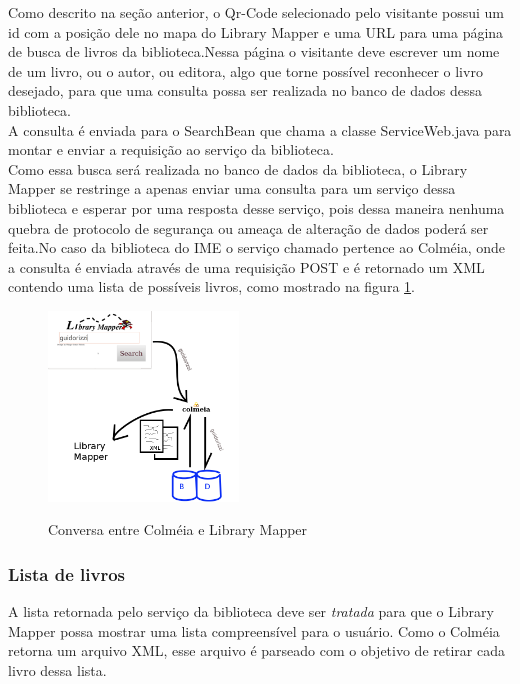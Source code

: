 \documentclass[a4paper,10pt]{article}
\begin{document}
	Como descrito na seção anterior, o Qr-Code selecionado pelo visitante possui um id com a posição dele no mapa do Library Mapper 
	e uma
	URL para uma página de busca de livros da biblioteca.Nessa página o visitante deve escrever um nome de um livro, ou o autor, 
	ou editora,
	 algo que torne possível reconhecer o livro desejado, para que uma consulta possa ser realizada no banco de dados dessa biblioteca.\\
	
	A consulta é enviada para o SearchBean que chama a classe ServiceWeb.java para montar e enviar a requisição ao serviço da biblioteca.\\

	Como essa busca será realizada no banco de dados da biblioteca, o Library Mapper se restringe a apenas enviar uma consulta para um serviço 
	 dessa biblioteca e esperar por uma resposta desse serviço, pois dessa maneira nenhuma quebra de protocolo de segurança ou ameaça de
	 alteração de 
	dados poderá ser feita.No caso da biblioteca do IME o serviço chamado pertence ao Colméia, onde a consulta é enviada através 
	de uma requisição
	POST e é retornado um XML contendo uma lista de possíveis livros, como mostrado na figura \ref{colmeia}.

		\begin{figure}[H]
	\centering
	\includegraphics[width=0.45\textwidth]{./imgs/colmeia.png}\\[0.5cm]    
	\caption{Conversa entre Colméia e Library Mapper}
	\label{colmeia}
\end{figure}
	\subsubsection{Lista de livros }
		A lista retornada pelo serviço da biblioteca deve ser {\it tratada}  para que o Library Mapper possa mostrar	 uma lista
	 compreensível para o usuário.
	Como o Colméia retorna um arquivo XML, esse arquivo é parseado com o objetivo de retirar cada livro dessa lista.\\
\end{document}
